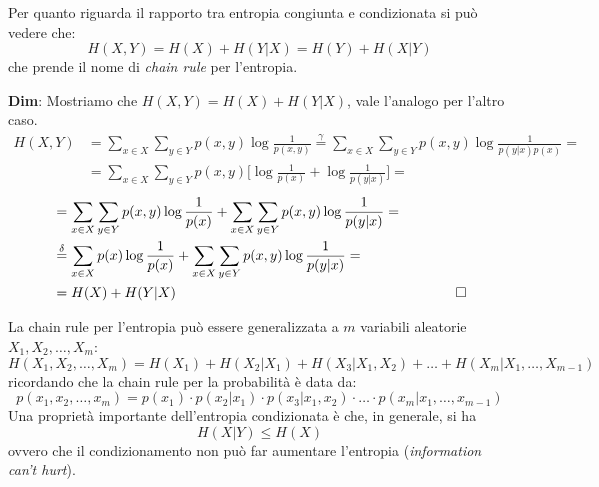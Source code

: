 Per quanto riguarda il rapporto tra entropia congiunta e condizionata si pu\`o vedere che:
\begin{equation}
H(X,Y) = H(X) + H(Y|X) = H(Y) + H(X|Y)
\end{equation}
che prende il nome di \textit{chain rule} per l'entropia.
\begin{tcolorbox}
\textbf{Dim}: Mostriamo che $H(X,Y) = H(X) + H(Y|X)$, vale l'analogo per l'altro caso.
\begin{align*}
    H(X,Y) &= \sum_{x \in X} \sum_{y \in Y} p(x,y) \log \frac{1}{p(x,y)} \overset{\gamma}{=} \sum_{x \in X} \sum_{y \in Y} p(x,y) \log \frac{1}{p(y|x)p(x)} = \\
    &= \sum_{x \in X} \sum_{y \in Y} p(x,y) \Big [ \log \frac{1}{p(x)} + \log \frac{1}{p(y|x)} \Big] = 
\end{align*}
\begin{align*}
    &= \sum_{x \in X} \sum_{y \in Y} p(x,y) \log \frac{1}{p(x)} + \sum_{x \in X} \sum_{y \in Y} p(x,y) \log \frac{1}{p(y|x)} = \\
    &\overset{\delta}{=} \sum_{x \in X} p(x) \info{x} + \sum_{x \in X} \sum_{y \in Y} p(x,y) \log \frac{1}{p(y|x)} = \\
    &= H(X) + H(Y|X) \hspace{200pt} \square
\end{align*}
\end{tcolorbox}
La chain rule per l'entropia pu\`o essere generalizzata a $m$ variabili aleatorie $X_1, X_2, \dots, X_m$:
\begin{equation}
    H(X_1, X_2, \dots, X_m) = H(X_1) + H(X_2|X_1) + H(X_3|X_1, X_2) + \dots + H(X_m|X_1, \dots, X_{m-1})
\end{equation}
ricordando che la chain rule per la probabilit\`a \`e data da:
\begin{equation}
\label{eqn:probchain}
    p(x_1, x_2, \dots, x_m) = p(x_1) \cdot p(x_2|x_1) \cdot p(x_3|x_1, x_2) \cdot \dots \cdot p(x_m|x_1, \dots, x_{m-1})
\end{equation}
Una propriet\`a importante dell'entropia condizionata \`e che, in generale, si ha
\begin{equation}
    H(X|Y) \leq H(X)
\end{equation}
ovvero che il condizionamento non pu\`o far aumentare l'entropia (\textit{information can't hurt}).

